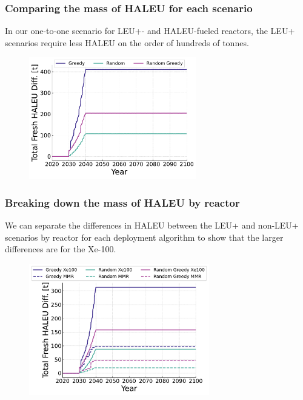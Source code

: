 \documentclass[9pt]{beamer}
\begin{document}
  \begin{frame}
    \frametitle{Comparing the mass of HALEU for each scenario}
    In our one-to-one scenario for LEU+- and HALEU-fueled reactors, the LEU+ scenarios require less HALEU on the order of hundreds of tonnes.
    \begin{figure}
        \centering
        \includegraphics[width=0.65\textwidth]{../images/diff_scheme.pdf}
    \end{figure}
  \end{frame}

  \begin{frame}
    \frametitle{Breaking down the mass of HALEU by reactor}
    We can separate the differences in HALEU between the LEU+ and non-LEU+ scenarios by reactor for each deployment algorithm to show that the larger differences are for the Xe-100.
    \begin{figure}
      \centering
      \includegraphics[width=0.7\textwidth]{../images/diff_reactor_fuel.pdf}
    \end{figure}
  \end{frame}
\end{document}
